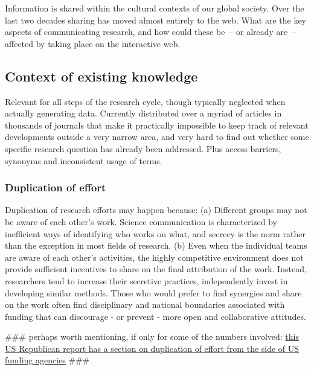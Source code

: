 \documentclass[final,authoryear,3p]{elsarticle-open-drafting}
\begin{document}
Information is shared within the cultural contexts of our global society. Over the last two decades sharing has moved almost entirely to the web. What are the key aspects of communicating research, and how could these be~-- or already are~-- affected by taking place on the interactive web.

\subsection{Context of existing knowledge}
Relevant for all steps of the research cycle, though typically neglected when actually generating data. Currently distributed over a myriad of articles in thousands of journals that make it practically impossible to keep track of relevant developments outside a very narrow area, and very hard to find out whether some specific research question has already been addressed. Plus access barriers, synonyms and inconsistent usage of terms.

\subsubsection{Duplication of effort}

Duplication of research efforts may happen because:
(a) Different groups may not be aware of each other's work. Science communication is characterized by inefficient ways of identifying who works on what, and secrecy is the norm rather than the exception in most fields of research.
(b) Even when the individual teams are aware of each other's activities, the highly competitive environment does not provide sufficient incentives to share on the final attribution of the work. Instead, researchers tend to increase their secretive practices, independently invest in developing similar methods. Those who would prefer to find synergies and share on the work often find disciplinary and national boundaries associated with funding that can discourage - or prevent - more open and collaborative attitudes. 

\#\#\# perhaps worth mentioning, if only for some of the numbers involved: \href{http://coburn.senate.gov/public/index.cfm/2011/5/dr-coburn-releases-new-oversight-report-exposing-waste-mismanagement-at-the-national-science-foundation}{this US Republican report has a section on duplication of effort from the side of US funding agencies} \#\#\#
\end{document}
